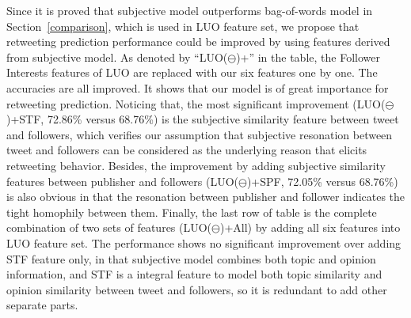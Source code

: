 \documentclass{acm_proc_article-sp}
\begin{document}
Since it is proved that subjective model outperforms bag-of-words model in Section~\ref{comparison}, which is used in LUO feature set, we propose that retweeting prediction performance could be improved by using features derived from subjective model. 
As denoted by ``LUO($ \ominus $)+'' in the table, the Follower Interests features of LUO are replaced with our six features one by one. 
The accuracies are all improved. It shows that our model is of great importance for retweeting prediction. 
Noticing that, the most significant improvement (LUO($ \ominus $)+STF, 72.86\% versus 68.76\%) is the subjective similarity feature between tweet and followers, which verifies our assumption that subjective resonation between tweet and followers can be considered as the underlying reason that elicits retweeting behavior.
Besides, the improvement by adding subjective similarity features between publisher and followers (LUO($ \ominus $)+SPF, 72.05\% versus 68.76\%) is also obvious in that the resonation between publisher and follower indicates the tight homophily between them.
Finally, the last row of table is the complete combination of two sets of features (LUO($ \ominus $)+All) by adding all six features into LUO feature set. 
The performance shows no significant improvement over adding STF feature only, in that subjective model combines both topic and opinion information, and STF is a integral feature to model both topic similarity and opinion similarity between tweet and followers, so it is redundant to add other separate parts.
\end{document}
